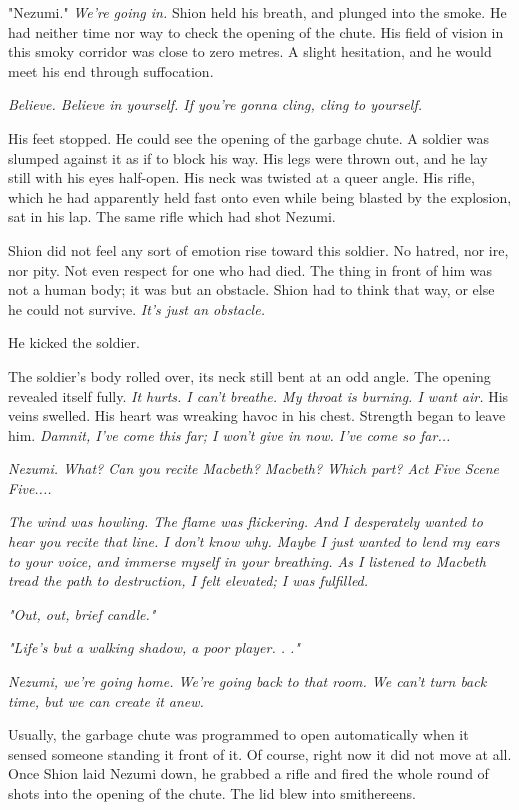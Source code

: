 "Nezumi." \emph{We're going in.} Shion held his breath, and plunged into the
smoke. He had neither time nor way to check the opening of the chute.
His field of vision in this smoky corridor was close to zero metres. A
slight hesitation, and he would meet his end through suffocation.

\emph{Believe. Believe in yourself. If you're gonna cling, cling to yourself.}

His feet stopped. He could see the opening of the garbage chute. A
soldier was slumped against it as if to block his way. His legs were
thrown out, and he lay still with his eyes half-open. His neck was
twisted at a queer angle. His rifle, which he had apparently held fast
onto even while being blasted by the explosion, sat in his lap. The same
rifle which had shot Nezumi.

Shion did not feel any sort of emotion rise toward this soldier. No
hatred, nor ire, nor pity. Not even respect for one who had died. The
thing in front of him was not a human body; it was but an obstacle.
Shion had to think that way, or else he could not survive. \emph{It's just an
obstacle.}

He kicked the soldier.

The soldier's body rolled over, its neck still bent at an odd angle. The
opening revealed itself fully. \emph{It hurts. I can't breathe. My throat is
burning. I want air.} His veins swelled. His heart was wreaking havoc in
his chest. Strength began to leave him. \emph{Damnit, I've come this far; I
won't give in now. I've come so far...}

\emph{Nezumi. What? Can you recite \emph{Macbeth}? \emph{Macbeth}? Which part? Act Five
Scene Five....}

\emph{The wind was howling. The flame was flickering. And I desperately wanted
to hear you recite that line. I don't know why. Maybe I just wanted to
lend my ears to your voice, and immerse myself in your breathing. As I
listened to Macbeth tread the path to destruction, I felt elevated; I
was fulfilled.}

\emph{"Out, out, brief candle."}

\emph{"Life's but a walking shadow, a poor player. . ."}

\emph{Nezumi, we're going home. We're going back to that room. We can't turn
back time, but we can create it anew.}

Usually, the garbage chute was programmed to open automatically when it
sensed someone standing it front of it. Of course, right now it did not
move at all. Once Shion laid Nezumi down, he grabbed a rifle and fired
the whole round of shots into the opening of the chute. The lid blew
into smithereens.


